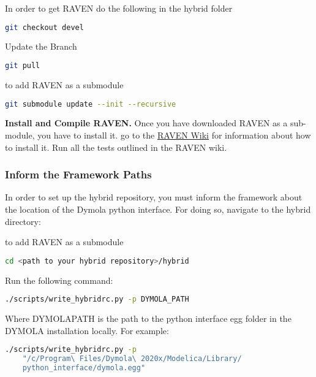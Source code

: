 In order to get RAVEN do the following in the hybrid folder

\begin{lstlisting}[language=bash]
git checkout devel
\end{lstlisting}

Update the Branch

\begin{lstlisting}[language=bash]
git pull
\end{lstlisting}

to add RAVEN as a submodule
\begin{lstlisting}[language=bash]
git submodule update --init --recursive
\end{lstlisting}

\textbf{Install and Compile RAVEN. }
Once you have downloaded RAVEN as a sub-module, you have to install it. go to the \href{https://github.com/idaholab/raven/wiki/intallationMain}{RAVEN Wiki} for information about how to install it. Run all the tests outlined in the RAVEN wiki. 

\subsubsection{Inform the Framework Paths}

In order to set up the hybrid repository, you must inform the framework about the location of the Dymola python interface. For doing so, navigate to the hybrid directory:

to add RAVEN as a submodule
\begin{lstlisting}[language=bash]
cd <path to your hybrid repository>/hybrid
\end{lstlisting}
Run the following command:
\begin{lstlisting}[language=bash]
./scripts/write_hybridrc.py -p DYMOLA_PATH
\end{lstlisting}

Where DYMOLAPATH is the path to the python interface egg folder in the DYMOLA installation locally. For example:
 
\begin{lstlisting}[language=bash]
./scripts/write_hybridrc.py -p 
	"/c/Program\ Files/Dymola\ 2020x/Modelica/Library/
	python_interface/dymola.egg"
\end{lstlisting}
